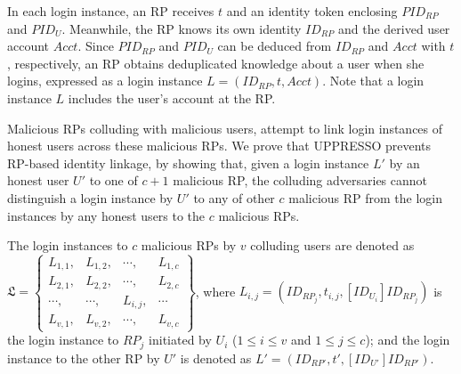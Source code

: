 
\vspace{1mm}

In each login instance, an RP receives $t$ %
and an identity token %
enclosing $PID_{RP}$ and $PID_U$. Meanwhile, the RP knows its own identity $ID_{RP}$ and the derived user account $Acct$.
Since $PID_{RP}$ and $PID_U$ can be deduced from $ID_{RP}$ and $Acct$ with $t$, respectively,
 an RP obtains deduplicated knowledge about a user when she logins,
  expressed as a login instance $L=(ID_{RP}, t, Acct)$.
Note that a login instance $L$ includes the user's account at the RP.



Malicious RPs colluding with malicious users, attempt to link login instances of honest users across these malicious RPs.
We prove that UPPRESSO prevents RP-based identity linkage, by showing that, given a login instance $L'$ by an honest user $U'$ to one of $c+1$ malicious RP, the colluding adversaries cannot distinguish a login instance by $U'$ to any of other $c$ malicious RP from the login instances by any honest users to the $c$ malicious RPs.

The login instances to $c$ malicious RPs by $v$ colluding users are denoted as $\mathfrak{L}=\left \{ \begin{matrix}
L_{1,1},&L_{1,2},&\cdots,&L_{1,c}\\
L_{2,1},& L_{2,2},&\cdots,&L_{2,c}\\
\cdots,&\cdots,&L_{i,j},&\cdots\\
L_{v,1},&L_{v,2},&\cdots,&L_{v,c}
\end{matrix}\right\}$, where $L_{i,j} = (ID_{RP_j}, t_{i,j}, [ID_{U_i}]ID_{RP_j})$ is the login instance to $RP_j$ initiated by $U_i$ ($1 \le i \le v$ and $1 \le j \le c$); and the login instance to the other RP by $U'$ is denoted as $L' = (ID_{RP'}, t', [ID_{U'}]ID_{RP'})$.

